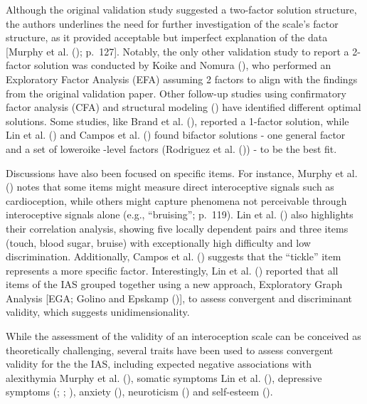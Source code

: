 \documentclass[
  man,
  floatsintext,
  longtable,
  nolmodern,
  notxfonts,
  notimes,
  colorlinks=true,linkcolor=blue,citecolor=blue,urlcolor=blue]{apa7}
\begin{document}
Although the original validation study suggested a two-factor solution
structure, the authors underlines the need for further investigation of
the scale's factor structure, as it provided acceptable but imperfect
explanation of the data {[}Murphy et al.
(); p.~127{]}. Notably, the only other
validation study to report a 2-factor solution was conducted by Koike
and Nomura (), who performed an
Exploratory Factor Analysis (EFA) assuming 2 factors to align with the
findings from the original validation paper. Other follow-up studies
using confirmatory factor analysis (CFA) and structural modeling
() have identified different
optimal solutions. Some studies, like Brand et al.
(), reported a 1-factor solution, while
Lin et al. () and Campos et al.
() found bifactor solutions - one general
factor and a set of loweroike -level factors (Rodriguez et al.
()) - to be the best fit.

Discussions have also been focused on specific items. For instance,
Murphy et al. () notes that some items
might measure direct interoceptive signals such as cardioception, while
others might capture phenomena not perceivable through interoceptive
signals alone (e.g., ``bruising''; p.~119). Lin et al.
() also highlights their correlation
analysis, showing five locally dependent pairs and three items (touch,
blood sugar, bruise) with exceptionally high difficulty and low
discrimination. Additionally, Campos et al.
() suggests that the ``tickle'' item
represents a more specific factor. Interestingly, Lin et al.
() reported that all items of the IAS
grouped together using a new approach, Exploratory Graph Analysis
{[}EGA; Golino and Epskamp
(){]}, to assess convergent
and discriminant validity, which suggests unidimensionality.

While the assessment of the validity of an interoception scale can be
conceived as theoretically challenging, several traits have been used to
assess convergent validity for the the IAS, including expected negative
associations with alexithymia Murphy et al.
(), somatic symptoms Lin et al.
(), depressive symptoms
(;
;
), anxiety
(), neuroticism
() and self-esteem
().
\end{document}

